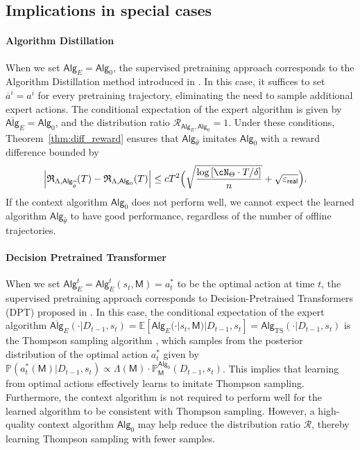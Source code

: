 \documentclass[10pt]{article}
\renewcommand{\epsilon}{\varepsilon}
\newcommand{\<}{\left\langle}
\renewcommand{\>}{\right\rangle}
\newcommand{\brac}[1]{{\left[ #1 \right]}}
\newcommand{\E}{\mathbb{E}}
\renewcommand{\P}{\mathbb{P}}
\newcommand{\inst}{{\mathsf{M}}}
\newcommand{\TS}{{\mathrm{TS}}}
\newcommand{\widebar}[1]{\overline{#1}}
\newcommand{\state}{{s}}
\newcommand{\action}{{a}}
\newcommand{\eaction}{{\widebar{a}}}
\newcommand{\totlen}{{T}}
\newcommand{\ith}{{i}}
\newcommand{\sAlg}{{\mathsf{Alg}}}
\newcommand{\osAlg}{\overline{\mathsf{Alg}}}
\newcommand{\dset}{{D}}
\newcommand{\Parspace}{{\Theta}}
\newcommand{\EstPar}{{\widehat{\theta}}}
\newcommand{\prior}{{\Lambda}}
\newcommand{\shortexp}{{E}}
\newcommand{\geneps}{{\epsilon}_{\sf real}}
\newcommand{\totreward}{{\mathfrak{R}}}
\newcommand{\distratio}{{\mathcal{R}}}
\begin{document}
\subsection{Implications in special cases}
\paragraph{Algorithm Distillation} When we set $\sAlg_\shortexp = \sAlg_0$, the supervised pretraining approach corresponds to the Algorithm Distillation method introduced in \cite{laskin2022context}. In this case, it suffices to set $\eaction^\ith = \action^\ith$ for every pretraining trajectory, eliminating the need to sample additional expert actions. The conditional expectation of the expert algorithm is given by $\osAlg_\shortexp = \sAlg_0$, and the distribution ratio $\distratio_{\sAlg_\shortexp,\sAlg_0}=1$. Under these conditions, Theorem~\ref{thm:diff_reward} ensures that $\sAlg_\EstPar$ imitates $\sAlg_0$ with a reward difference bounded by
\begin{align*}
\Big|\totreward_{\prior,\sAlg_\EstPar}(\totlen)-\totreward_{\prior,\sAlg_0}(\totlen)\Big|
&\leq c \totlen^2 \Big( \sqrt{\frac{\log \brac{ \cN_{\Parspace} \cdot \totlen/\delta } }{n} } + \sqrt{\geneps} \Big).
\end{align*}
If the context algorithm $\sAlg_0$ does not perform well, we cannot expect the learned algorithm $\sAlg_\EstPar$ to have good performance, regardless of the number of offline trajectories.
\paragraph{Decision Pretrained Transformer} When we set $\sAlg_\shortexp^t = \sAlg_\shortexp^t(\state_t,\inst)=\action^*_t$ to be the optimal action at time $t$, the supervised pretraining approach corresponds to Decision-Pretrained Transformers (DPT) proposed in \cite{lee2023supervised}. In this case, the conditional expectation of the expert algorithm $\osAlg_\shortexp(\cdot|\dset_{t-1},\state_t)=\E[\sAlg_{\shortexp}(\cdot|\state_t,\inst)|\dset_{t-1},\state_t]=\sAlg_{\TS}(\cdot|\dset_{t-1},\state_t)$ is the Thompson sampling algorithm \citep[Theorem 1]{lee2023supervised}, which samples from the posterior distribution of the optimal action $\action^*_t$ given by $\P(a^*_t(\inst) |\dset_{t-1},\state_t)\propto \prior(\inst)\cdot\P_\inst^{\sAlg_0}(\dset_{t-1},\state_t)$. This implies that learning from optimal actions effectively learns to imitate Thompson sampling. Furthermore, the context algorithm is not required to perform well for the learned algorithm to be consistent with Thompson sampling. However, a high-quality context algorithm $\sAlg_0$ may help reduce the distribution ratio $\distratio$, thereby learning Thompson sampling with fewer samples.
\end{document}
